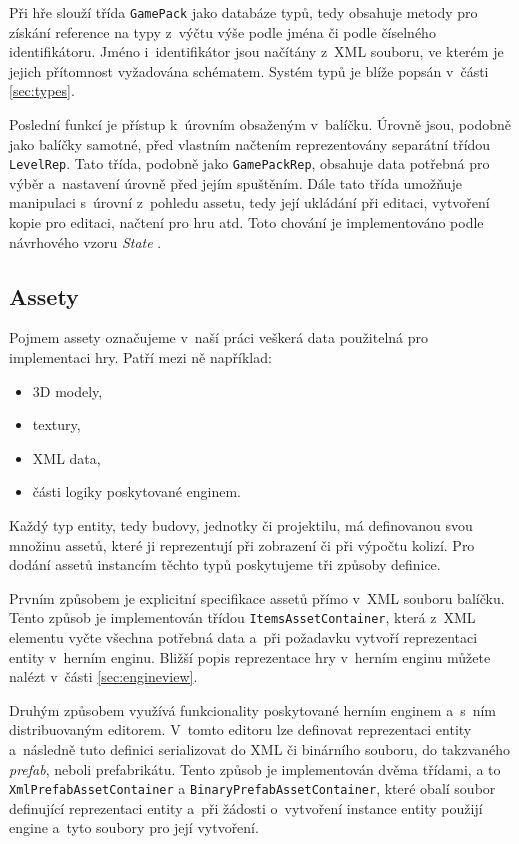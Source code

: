Při hře slouží třída \texttt{GamePack} jako databáze typů, tedy obsahuje metody pro získání reference na typy z~výčtu výše podle jména či podle číselného identifikátoru. Jméno i~identifikátor jsou načítány z~XML souboru, ve kterém je jejich přítomnost vyžadována schématem. Systém typů je blíže popsán v~části \ref{sec:types}.

Poslední funkcí je přístup k~úrovním obsaženým v~balíčku. Úrovně jsou, podobně jako balíčky samotné, před vlastním načtením reprezentovány separátní třídou \texttt{LevelRep}. Tato třída, podobně jako \texttt{GamePackRep}, obsahuje data potřebná pro výběr a~nastavení úrovně před jejím spuštěním. Dále tato třída umožňuje manipulaci s~úrovní z~pohledu assetu, tedy její ukládání při editaci, vytvoření kopie pro editaci, načtení pro hru atd. Toto chování je implementováno podle návrhového vzoru \textit{State} \citep[str.~305]{book:gangoffour}.

\subsection{Assety}
\label{sec:assets}
Pojmem assety označujeme v~naší práci veškerá data použitelná pro implementaci hry. Patří mezi ně například:

\begin{itemize}
	\item 3D modely,
	\item textury,
	\item XML data,
	\item části logiky poskytované enginem.
\end{itemize}

Každý typ entity, tedy budovy, jednotky či projektilu, má definovanou svou množinu assetů, které ji reprezentují při zobrazení či při výpočtu kolizí. Pro dodání assetů instancím těchto typů poskytujeme tři způsoby definice.

Prvním způsobem je explicitní specifikace assetů přímo v~XML souboru balíčku. Tento způsob je implementován třídou \texttt{ItemsAssetContainer}, která z~XML elementu vyčte všechna potřebná data a~při požadavku vytvoří reprezentaci entity v~herním enginu. Bližší popis reprezentace hry v~herním enginu můžete nalézt v~části \ref{sec:engineview}.

Druhým způsobem využívá funkcionality poskytované herním enginem a~s~ním distribuovaným editorem. V~tomto editoru lze definovat reprezentaci entity a~následně tuto definici serializovat do XML či binárního souboru, do takzvaného \textit{prefab}, neboli prefabrikátu. Tento způsob je implementován dvěma třídami, a to \texttt{XmlPrefabAssetContainer} a \texttt{BinaryPrefabAssetContainer}, které obalí soubor definující reprezentaci entity a~při žádosti o~vytvoření instance entity použijí engine a~tyto soubory pro její vytvoření.

